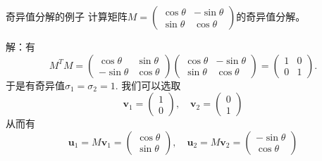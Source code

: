 \begin{frame}

\begin{block}{奇异值分解的例子}
计算矩阵$M = \begin{pmatrix} \cos\theta & -\sin\theta \\ \sin\theta & \cos\theta \end{pmatrix}$的奇异值分解。

\vspace{1em}
\pause

解：有
$$M^TM = \begin{pmatrix} \cos\theta & \sin\theta \\ -\sin\theta & \cos\theta \end{pmatrix} \begin{pmatrix} \cos\theta & -\sin\theta \\ \sin\theta & \cos\theta \end{pmatrix} = \begin{pmatrix} 1 & 0 \\ 0 & 1 \end{pmatrix}.$$
于是有奇异值$\sigma_1 = \sigma_2 = 1$. 我们可以选取
$$\mathbf{v}_1 = \begin{pmatrix} 1 \\ 0 \end{pmatrix}, \quad \mathbf{v}_2 = \begin{pmatrix} 0 \\ 1 \end{pmatrix}$$
从而有
$$\mathbf{u}_1 = M\mathbf{v}_1 = \begin{pmatrix} \cos\theta \\ \sin\theta \end{pmatrix}, \quad \mathbf{u}_2 = M\mathbf{v}_2 = \begin{pmatrix} -\sin\theta \\ \cos\theta \end{pmatrix}$$
\end{block}

\end{frame}



